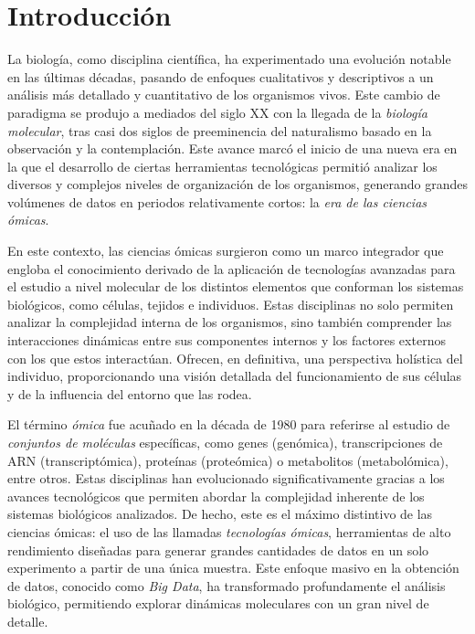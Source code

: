 \chapter{Introducción}

La biología, como disciplina científica, ha experimentado una evolución notable en las últimas décadas, 
pasando de enfoques cualitativos y descriptivos a un análisis más detallado y cuantitativo de los organismos 
vivos. Este cambio de paradigma se produjo a mediados del siglo XX con la llegada de la \textit{biología molecular},
tras casi dos siglos de preeminencia del naturalismo basado en la observación y la contemplación. 
Este avance marcó el inicio de una nueva era en la que el desarrollo de ciertas herramientas tecnológicas permitió 
analizar los diversos y complejos niveles de organización de los organismos, generando grandes volúmenes de datos 
en periodos relativamente cortos: la \textit{era de las ciencias ómicas}. \newline%

En este contexto, las ciencias ómicas surgieron como un marco integrador que engloba el conocimiento derivado 
de la aplicación de tecnologías avanzadas para el estudio a nivel molecular de los distintos elementos que 
conforman los sistemas biológicos, como células, tejidos e individuos. Estas disciplinas no solo permiten 
analizar la complejidad interna de los organismos, sino también comprender las interacciones dinámicas 
entre sus componentes internos y los factores externos con los que estos interactúan. Ofrecen, en definitiva,
una perspectiva holística del individuo, proporcionando una visión detallada del funcionamiento de sus células 
y de la influencia del entorno que las rodea. \newline%

El término \textit{ómica} fue acuñado en la década de 1980 para referirse al estudio de 
\textit{conjuntos de moléculas} específicas, como genes (genómica), transcripciones de ARN (transcriptómica), 
proteínas (proteómica) o metabolitos (metabolómica), entre otros. Estas disciplinas han evolucionado 
significativamente gracias a los avances tecnológicos que permiten abordar la complejidad inherente de los 
sistemas biológicos analizados. De hecho, este es el máximo distintivo de las ciencias ómicas: el uso de las 
llamadas \textit{tecnologías ómicas}, herramientas de alto rendimiento diseñadas para generar grandes cantidades 
de datos en un solo experimento a partir de una única muestra. Este enfoque masivo en la obtención de datos, 
conocido como \textit{Big Data}, ha transformado profundamente el análisis biológico, permitiendo explorar 
dinámicas moleculares con un gran nivel de detalle.\newline%

